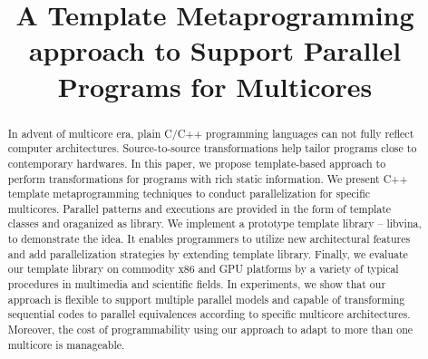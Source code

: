 \documentclass[conference]{IEEEtran}
\begin{document}
\title{A Template Metaprogramming approach to Support Parallel
  Programs for Multicores}


\author{
}
\maketitle


\begin{abstract}
In advent of multicore era, plain C/C++ programming languages can not
fully reflect computer architectures. Source-to-source
transformations help tailor programs close to contemporary
hardwares. In this paper, we propose template-based approach to perform 
transformations for programs with rich static information.
We present C++ template metaprogramming techniques to conduct
parallelization for specific
multicores. Parallel patterns and executions are provided in the form of
template classes and oraganized as library. We implement a prototype
template library -- libvina, to demonstrate the idea. It enables
programmers to utilize new architectural
features and add parallelization strategies by extending template library. 
Finally, we evaluate our template library on
commodity x86 and GPU platforms by a variety of typical procedures
in multimedia and scientific fields. In experiments, we show that our
approach is flexible to support multiple parallel models and capable
of transforming sequential codes to parallel equivalences according to
specific multicore architectures. Moreover, the cost of programmability using our
approach to adapt to more than one multicore is manageable.
\end{abstract}

\IEEEpeerreviewmaketitle



%






%





\end{document}
